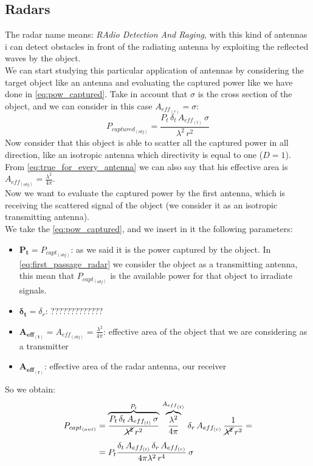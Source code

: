 \subsection*{Radars}
The radar name means: \emph{RAdio Detection And Raging}, with this kind of antennas i can detect obstacles in front of the radiating antenna by exploiting the reflected waves by the object.\\
We can start studying this particular application of antennas by considering the target object like an antenna and evaluating the captured power like we have done in \cref{eq:pow_captured}. Take in account that $\sigma$ is the cross section of the object, and we can consider in this case $A_{eff_{(r)}}=\sigma$:
\begin{equation}
    P_{captured_{(obj)}}=\frac{P_t\,\delta_t\,A_{eff_{(t)}}\,\sigma}{\lambda^2\,r^2}
\end{equation}
Now consider that this object is able to scatter all the captured power in all direction, like an isotropic antenna which directivity is equal to one ($D = 1$). From \cref{eq:true_for_every_antenna} we can also say that his effective area is $A_{eff_{(obj)}}=\frac{\lambda^2}{4\pi}$.\\
Now we want to evaluate the captured power by the first antenna, which is receiving the scattered signal of the object (we consider it as an isotropic transmitting antenna).\\
We take the \cref{eq:pow_captured}, and we insert in it the following parameters:
\begin{itemize}
    \item $\bm{P_t}=P_{capt_{(obj)}}$: as we said it is the power captured by the object. In \cref{eq:first_passage_radar} we consider the object as a transmitting antenna, this mean that $P_{capt_{(obj)}}$ is the available power for that object to irradiate signals.
    \item $\bm{\delta_t}=\delta_{r}$: ?????????????
    \item $\bm{A_{{eff}_{(t)}}}=A_{eff_{(obj)}}=\frac{\lambda^2}{4\pi}$: effective area of the object that we are considering as a transmitter
    \item $\bm{A_{{eff}_{(r)}}}$: effective area of the radar antenna, our receiver
\end{itemize}
So we obtain:
\begin{align}\label{eq:first_passage_radar}
    \begin{split}
    P_{capt_{(ant)}}&=\overbrace{\frac{P_t\,\delta_t\,A_{eff_{(t)}}\,\sigma}{\cancel{\lambda^2}\,r^2}}^{P_t}\,\overbrace{\frac{\lambda^2}{4\pi}}^{A_{{eff}_{(t)}}}\,\delta_{r}\,A_{eff_{(r)}}\,\frac{1}{\cancel{\lambda^2}\,r^2}=\\[5pt]
    &=P_t\frac{\delta_t\,A_{eff_{(t)}}\,\delta_r\,A_{eff_{(r)}}}{4\pi\lambda^2\,r^4}\,\sigma
    \end{split}
\end{align}
